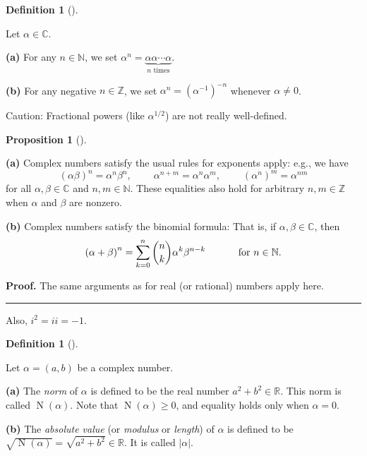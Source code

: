\documentclass[numbers=enddot,12pt,final,onecolumn,notitlepage]{scrartcl}%
\numberwithin{exer}{subsection}
\theoremstyle{definition}
\newtheorem{prop}[theo]{Proposition}
\newenvironment{proposition}[1][]
{\begin{prop}[#1]\begin{leftbar}}
{\end{leftbar}\end{prop}}
\newtheorem{defi}[theo]{Definition}
\newenvironment{definition}[1][]
{\begin{defi}[#1]\begin{leftbar}}
{\end{leftbar}\end{defi}}
\newenvironment{proof}[1][Proof]{\noindent\textbf{#1.} }{\ \rule{0.5em}{0.5em}}
\let\sumnonlimits\sum
\renewcommand{\sum}{\sumnonlimits\limits}
\begin{document}
\begin{definition}
\label{def.CC.CC.power}Let $\alpha\in\mathbb{C}$.

\textbf{(a)} For any $n\in\mathbb{N}$, we set $\alpha^{n}=\underbrace{\alpha
\alpha\cdots\alpha}_{n\text{ times}}$.

\textbf{(b)} For any negative $n\in\mathbb{Z}$, we set $\alpha^{n}=\left(
\alpha^{-1}\right)  ^{-n}$ whenever $\alpha\neq0$.
\end{definition}

Caution: Fractional powers (like $\alpha^{1/2}$) are not really well-defined.

\begin{proposition}
\textbf{(a)} Complex numbers satisfy the usual rules for exponents apply:
e.g., we have%
\[
\left(  \alpha\beta\right)  ^{n}=\alpha^{n}\beta^{n}%
,\ \ \ \ \ \ \ \ \ \ \alpha^{n+m}=\alpha^{n}\alpha^{m}%
,\ \ \ \ \ \ \ \ \ \ \left(  \alpha^{n}\right)  ^{m}=\alpha^{nm}%
\]
for all $\alpha,\beta\in\mathbb{C}$ and $n,m\in\mathbb{N}$. These equalities
also hold for arbitrary $n,m\in\mathbb{Z}$ when $\alpha$ and $\beta$ are nonzero.

\textbf{(b)} Complex numbers satisfy the binomial formula: That is, if
$\alpha,\beta\in\mathbb{C}$, then%
\[
\left(  \alpha+\beta\right)  ^{n}=\sum_{k=0}^{n}\dbinom{n}{k}\alpha^{k}%
\beta^{n-k}\ \ \ \ \ \ \ \ \ \ \text{for }n\in\mathbb{N}\text{.}%
\]

\end{proposition}

\begin{proof}
The same arguments as for real (or rational) numbers apply here.
\end{proof}

Also, $i^{2}=ii=-1$.

\begin{definition}
\label{def.CC.norm.norm-abs}Let $\alpha=\left(  a,b\right)  $ be a complex number.

\textbf{(a)} The \textit{norm} of $\alpha$ is defined to be the real number
$a^{2}+b^{2}\in\mathbb{R}$. This norm is called $\operatorname*{N}\left(
\alpha\right)  $. Note that $\operatorname*{N}\left(  \alpha\right)  \geq0$,
and equality holds only when $\alpha=0$.

\textbf{(b)} The \textit{absolute value} (or \textit{modulus} or
\textit{length}) of $\alpha$ is defined to be $\sqrt{\operatorname*{N}\left(
\alpha\right)  }=\sqrt{a^{2}+b^{2}}\in\mathbb{R}$. It is called $\left\vert
\alpha\right\vert $.
\end{definition}
\end{document}
